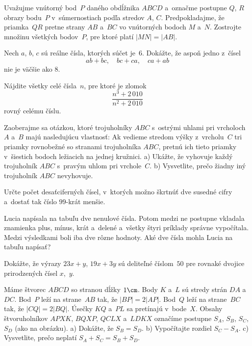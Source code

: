 {%
Uvažujme vnútorný bod~$P$ daného obdĺžnika $ABCD$ a~označme postupne $Q$, $R$ obrazy bodu~$P$
v~súmernostiach podľa stredov $A$, $C$. Predpokladajme, že priamka~$QR$ pretne strany
$AB$ a~$BC$ vo vnútorných bodoch $M$ a~$N$.
Zostrojte množinu všetkých bodov~$P$, pre ktoré platí $|MN|=|AB|$.
}

{%
Nech $a$, $b$, $c$ sú reálne čísla, ktorých súčet je~$6$.
Dokážte, že aspoň jedno z~čísel
$$
ab+bc,\quad bc+ca,\quad ca+ab
$$
nie je väčšie ako $8$.
}

{%
Nájdite všetky celé čísla~$n$, pre ktoré je zlomok
$$
\frac {n^3+2\,010}{n^2+2\,010}
$$
rovný celému číslu.}

{%
Zaoberajme sa otázkou, ktoré trojuholníky $ABC$ s~ostrými uhlami
pri vrcholoch $A$ a~$B$ majú nasledujúcu vlastnosť:
Ak vedieme stredom výšky z~vrcholu~$C$ tri priamky
rovnobežné so stranami trojuholníka $ABC$, pretnú ich tieto priamky
v~šiestich bodoch ležiacich na jednej kružnici.
\ite a) Ukážte, že vyhovuje každý trojuholník $ABC$ s~pravým uhlom pri vrchole~$C$.
\ite b) Vysvetlite, prečo žiadny iný trojuholník $ABC$ nevyhovuje.}

{%
Určte počet desaťciferných čísel, v~ktorých možno škrtnúť dve susedné cifry
a~dostať tak číslo $99$-krát menšie.}

{%
Lucia napísala na tabuľu dve nenulové čísla. Potom medzi ne postupne vkladala znamienka
plus, mínus, krát a~delené a~všetky štyri príklady správne vypočítala. Medzi výsledkami
boli iba dve rôzne hodnoty. Aké dve čísla mohla Lucia na tabuľu %
napísať?}

{%
Dokážte, že výrazy $23x + y$, $19x + 3y$ sú deliteľné číslom~$50$ pre rovnaké dvojice
prirodzených čísel $x$,~$y$.}

{%
Máme štvorec $ABCD$ so stranou dĺžky $1\cm$. Body $K$ a~$L$ sú
stredy strán $DA$ a~$DC$. Bod~$P$ leží na strane~$AB$ tak, že $|BP| =
2|AP|$. Bod~$Q$ leží na strane~$BC$ tak, že $|CQ| = 2|BQ|$. Úsečky
$KQ$ a~$PL$ sa pretínajú v~bode~$X$. Obsahy štvoruholníkov $APXK$,
$BQXP$, $QCLX$ a~$LDKX$ označíme postupne $S_A$, $S_B$, $S_C$, $S_D$ (\ifobrazkyvedla{}ako na obrázku\else\obr{}\fi).
\ite a) Dokážte, že $S_B=S_D$.
\ite b) Vypočítajte rozdiel $S_C-S_A$.
\ite c) Vysvetlite, prečo neplatí $S_A + S_C = S_B + S_D$.
\ifobrazkyvedla\else{}\fi%
}

